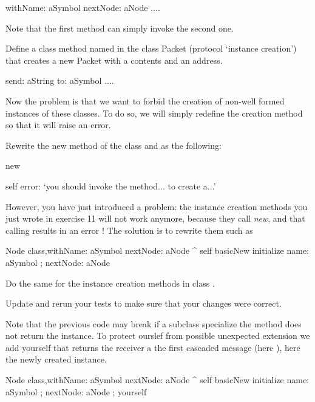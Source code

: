 \begin{scode}
withName: aSymbol nextNode: aNode
....
\end{scode}

Note that the first method can simply invoke the second one.

Define a class method named  in the class Packet (protocol `instance 
creation') that creates a new Packet with a contents and an address. 

\begin{scode}
send: aString to: aSymbol
....
\end{scode}

Now the problem is that we want to forbid the creation of non-well 
formed instances of these classes. To do so, we will simply redefine 
the creation method  so that it will raise an error.

\exercise  Rewrite the new method of the class  and  as 
the following:

\begin{scode}
new

    self error: `you should invoke the method... to create a...' 
\end{scode}

However, you have just introduced a problem: the instance creation 
methods you just wrote in exercise 11 will not work anymore, 
because they call \textit{new}, and that calling results in an error 
! The solution is to rewrite them such as 

\begin{scode}
Node class\sep{}withName: aSymbol nextNode: aNode
      ^ self basicNew initialize name: aSymbol ; nextNode: aNode
\end{scode}

Do the same for the instance creation methods in class .

\exercise Update and rerun your tests to make sure that your changes were correct.


Note that the previous code may break if a subclass specialize the  method does not return the instance. To protect ourslef from possible unexpected extension we add yourself that returns the receiver a the first cascaded message (here ), here the newly created instance. 

\begin{scode}
Node class\sep{}withName: aSymbol nextNode: aNode
      ^ self basicNew initialize name: aSymbol ; nextNode: aNode ; yourself
\end{scode}


